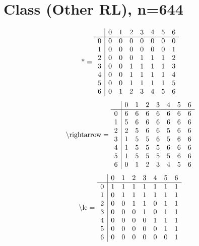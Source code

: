 \documentclass[11pt]{article}
\begin{document}
\section{Class (Other RL), n=644}
\[\text{*} = 
\begin{array}{r | r r r r r r r}
 & 0 & 1 & 2 & 3 & 4 & 5 & 6 \\ \hline
0 & 0 & 0 & 0 & 0 & 0 & 0 & 0 \\
1 & 0 & 0 & 0 & 0 & 0 & 0 & 1 \\
2 & 0 & 0 & 0 & 1 & 1 & 1 & 2 \\
3 & 0 & 0 & 1 & 1 & 1 & 1 & 3 \\
4 & 0 & 0 & 1 & 1 & 1 & 1 & 4 \\
5 & 0 & 0 & 1 & 1 & 1 & 1 & 5 \\
6 & 0 & 1 & 2 & 3 & 4 & 5 & 6 \\
\end{array}
\]
\[\text{\textbackslash rightarrow} = 
\begin{array}{r | r r r r r r r}
 & 0 & 1 & 2 & 3 & 4 & 5 & 6 \\ \hline
0 & 6 & 6 & 6 & 6 & 6 & 6 & 6 \\
1 & 5 & 6 & 6 & 6 & 6 & 6 & 6 \\
2 & 2 & 5 & 6 & 6 & 5 & 6 & 6 \\
3 & 1 & 5 & 5 & 6 & 5 & 6 & 6 \\
4 & 1 & 5 & 5 & 5 & 6 & 6 & 6 \\
5 & 1 & 5 & 5 & 5 & 5 & 6 & 6 \\
6 & 0 & 1 & 2 & 3 & 4 & 5 & 6 \\
\end{array}
\]
\[\text{\textbackslash le} = 
\begin{array}{r | r r r r r r r}
 & 0 & 1 & 2 & 3 & 4 & 5 & 6 \\ \hline
0 & 1 & 1 & 1 & 1 & 1 & 1 & 1 \\
1 & 0 & 1 & 1 & 1 & 1 & 1 & 1 \\
2 & 0 & 0 & 1 & 1 & 0 & 1 & 1 \\
3 & 0 & 0 & 0 & 1 & 0 & 1 & 1 \\
4 & 0 & 0 & 0 & 0 & 1 & 1 & 1 \\
5 & 0 & 0 & 0 & 0 & 0 & 1 & 1 \\
6 & 0 & 0 & 0 & 0 & 0 & 0 & 1 \\
\end{array}
\]
\end{document}
